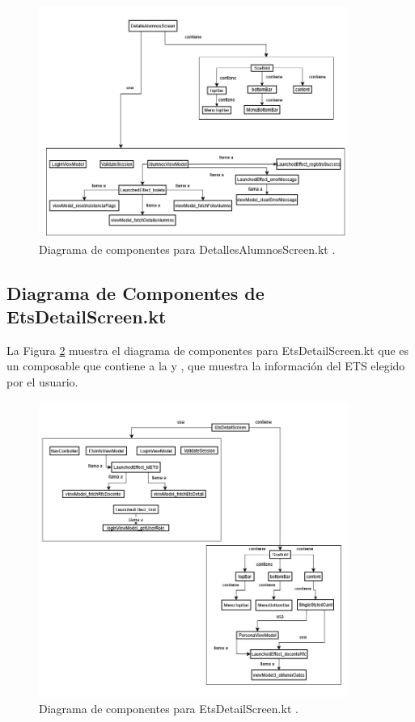 \begin{figure}[htbp!]
	\begin{center}
		\includegraphics[width=0.9\textwidth]{DiagramasMoviles/DCM (19)}
		\caption{Diagrama de componentes para DetallesAlumnosScreen.kt .}
		\label{fig:Componentes_6}
	\end{center}
\end{figure}

\newpage

\subsection{Diagrama de Componentes de EtsDetailScreen.kt}

La Figura \ref{fig:Componentes_7} muestra el diagrama de componentes para EtsDetailScreen.kt que es un composable que contiene a la  y , que muestra la información del ETS elegido por el usuario.

\begin{figure}[htbp!]
	\begin{center}
		\includegraphics[width=0.9\textwidth]{DiagramasMoviles/DCM (20)}
		\caption{Diagrama de componentes para EtsDetailScreen.kt .}
		\label{fig:Componentes_7}
	\end{center}
\end{figure}

